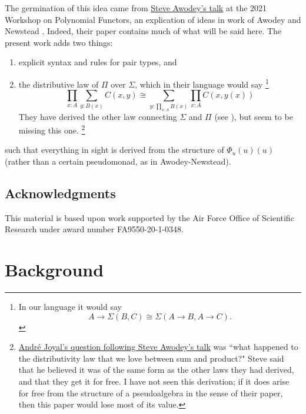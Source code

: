 \documentclass[11pt, one side, article]{memoir}
\theoremstyle{definition}
\theoremstyle{plain}
\newcommand{\0}{\textsf{0}}
\newcommand{\1}{\tn{\textsf{1}}}
\begin{document}
The germination of this idea came from \href{https://www.youtube.com/watch?v=RDuNIP4icKI\&t=10765s}{Steve Awodey's talk} at the 2021 Workshop on Polynomial Functors, an explication of ideas in work of Awodey and Newstead \cite{awodey2018polynomial}. Indeed, their paper contains much of what will be said here. The present work adds two things:
\begin{enumerate}
	\item explicit syntax and rules for pair types, and
	\item the distributive law of $\Pi$ over $\Sigma$, which in their language would say%
	\footnote{In our language it would say 
	\[
	A\to\Sigma(B,C)\cong \Sigma(A\to B,A\to C).
	\]
	}
	\[
	\prod_{x:A}\sum_{y:B(x)}C(x,y)\cong\sum_{y:\prod_{x:A}B(x)}\prod_{x:A}C(x,y(x))
	\]
	They have derived the other law connecting $\Sigma$ and $\Pi$ (see \cite[Remark 4.2]{awodey2018polynomial}), but seem to be missing this one.%
	\footnote{\href{https://youtu.be/RDuNIP4icKI?t=13898}{Andr\'{e} Joyal's question following Steve Awodey's talk} was ``what happened to the distributivity law that we love between sum and product?" Steve said that he believed it was of the same form as the other laws they had derived, and that they get it for free. I have not seen this derivation; if it does arise for free from the structure of a pseudoalgebra in the sense of their paper, then this paper would lose most of its value.
	}
\end{enumerate}
such that everything in sight is derived from the structure of $\Phi_u(u)(u)$ (rather than a certain pseudomonad, as in Awodey-Newstead).

\section{Acknowledgments}


This material is based upon work supported by the Air Force Office of Scientific Research under award number FA9550-20-1-0348.

\chapter{Background}
\end{document}
